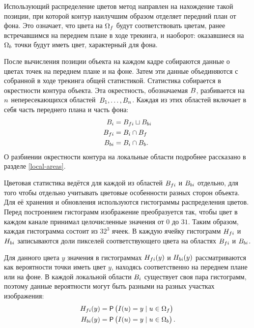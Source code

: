 
Использующий распределение цветов метод направлен на нахождение такой
позиции, при которой контур наилучшим образом отделяет передний план от фона.
Это означает, что цвета на $\Omega_f$ будут соответствовать цветам,
ранее встречавшимся на переднем плане в ходе трекинга, и наоборот:
оказавшиеся на $\Omega_b$ точки будут иметь цвет, характерный для фона.

После вычисления позиции объекта на каждом кадре собираются данные о цветах
точек на переднем плане и на фоне.
Затем эти данные объединяются с собранной в ходе трекинга общей статистикой.
Статистика собирается в окрестности контура объекта.
Эта окрестность, обозначаемая $B$, разбивается на $n$
непересекающихся областей~$B_1, \dots, B_{n}$.
Каждая из этих областей включает в себя часть переднего плана и часть фона:
\begin{align}\label{eqn:histo_partitioning}
    B_{i} &= {B_{fi}} \sqcup {\ensuremath{B_{bi}}} \\
    {B_{fi}} &= B_{i} \cap B_{f} \\
    {B_{bi}} &= B_{i} \cap B_{b}
\text{.}
\end{align}
О разбиении окрестности контура на локальные области подробнее рассказано в
разделе \ref{local-areas}.

Цветовая статистика ведётся для каждой из областей ${B_{fi}}$ и
${B_{bi}}$ отдельно, для того чтобы отдельно учитывать цветовые
особенности разных сторон объекта.
Для её хранения и обновления используются гистограммы распределения цветов.
Перед построением гистограмм изображение преобразуется так, чтобы цвет в каждом
канале принимал целочисленные значения от $0$ до $31$.
Таким образом, каждая гистограмма состоит из $32^3$ ячеек.
В каждую ячейку гистограмм ${H_{fi}}$ и $H_{bi}{}$
записываются доли пикселей соответствующего цвета на областях $B_{fi}$
и $B_{bi}$.

Для данного цвета $y$ значения в гистограммах $H_{fi}(y)$ и
$H_{bi}(y)$ рассматриваются как вероятности точки иметь цвет $y$,
находясь соответственно на переднем плане или на фоне.
В каждой локальной области $B_{i}$ существует своя пара гистограмм, поэтому
данные вероятности могут быть разными на разных участках изображения:
\begin{align}\label{eqn:H_f_Y}
    H_{fi}(y) &= \mathsf{P} \left( I(\mathnormal{u}) = y \mid \mathnormal{u} \in \Omega_f \right) \\
    H_{bi}(y) &= \mathsf{P} \left( I(\mathnormal{u}) = y \mid \mathnormal{u} \in \Omega_b \right)
\text{.}
\end{align}

